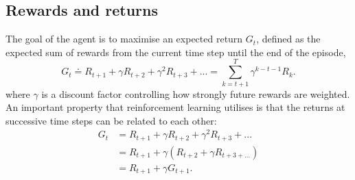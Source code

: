 \subsection{Rewards and returns}
The goal of the agent is to maximise an expected return $G_t$, defined as the expected sum of rewards from the current time step until the end of the episode,
\begin{equation}
G_t \doteq R_{t+1} + \gamma R_{t+2} + \gamma^2 R_{t+3} + ... = \sum_{k=t+1}^{T} \gamma^{k-t-1} R_{k}.
\label{eq:G_t}
\end{equation}
where $\gamma$ is a discount factor controlling how strongly future rewards are weighted. An important property that reinforcement learning utilises is that the returns at successive time steps can be related to each other:
\begin{equation}
\begin{split}
G_t &= R_{t+1} + \gamma R_{t+2} + \gamma^2 R_{t+3} + ... \\
&= R_{t+1} + \gamma (R_{t+2} + \gamma R_{t+3 + ...}) \\
&= R_{t+1} + \gamma G_{t+1}. 
\label{eq:G_t_recursive}
\end{split}
\end{equation}

